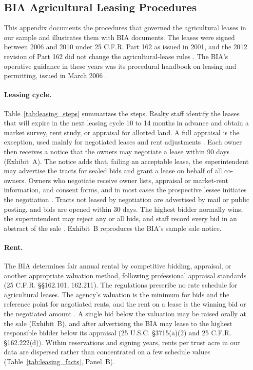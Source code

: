 \documentclass[12pt]{article}
\begin{document}
\subsection*{BIA Agricultural Leasing Procedures}

This appendix documents the procedures that governed the agricultural leases in our sample and illustrates them with BIA documents. The leases were signed between 2006 and 2010 under 25 C.F.R. Part 162 as issued in 2001, and the 2012 revision of Part 162 did not change the agricultural-lease rules \citep{DOI2001LeasingRule, BIA2012}. The BIA's operative guidance in these years was its procedural handbook on leasing and permitting, issued in March 2006 \citep{BIA2006Ch1, BIA2006Ch2}.

\paragraph{Leasing cycle.} Table~\ref{tab:leasing_steps} summarizes the steps. Realty staff identify the leases that will expire in the next leasing cycle 10 to 14 months in advance and obtain a market survey, rent study, or appraisal for allotted land. A full appraisal is the exception, used mainly for negotiated leases and rent adjustments \citep[pp.~6--7]{BIA2006Ch2}. Each owner then receives a notice that the owners may negotiate a lease within 90 days (Exhibit~A). The notice adds that, failing an acceptable lease, the superintendent may advertise the tracts for sealed bids and grant a lease on behalf of all co-owners. Owners who negotiate receive owner lists, appraisal or market-rent information, and consent forms, and in most cases the prospective lessee initiates the negotiation \citep[pp.~8--9]{BIA2006Ch2}. Tracts not leased by negotiation are advertised by mail or public posting, and bids are opened within 30 days. The highest bidder normally wins, the superintendent may reject any or all bids, and staff record every bid in an abstract of the sale \citep[pp.~15--17]{BIA2006Ch2}. Exhibit~B reproduces the BIA's sample sale notice.

\paragraph{Rent.} The BIA determines fair annual rental by competitive bidding, appraisal, or another appropriate valuation method, following professional appraisal standards (25 C.F.R. \S\S 162.101, 162.211). The regulations prescribe no rate schedule for agricultural leases. The agency's valuation is the minimum for bids and the reference point for negotiated rents, and the rent on a lease is the winning bid or the negotiated amount \citep[pp.~15--17]{BIA2006Ch2}. A single bid below the valuation may be raised orally at the sale (Exhibit~B), and after advertising the BIA may lease to the highest responsible bidder below its appraisal (25 U.S.C. \S 3715(a)(2) and 25 C.F.R. \S 162.222(d)). Within reservations and signing years, rents per trust acre in our data are dispersed rather than concentrated on a few schedule values (Table~\ref{tab:leasing_facts}, Panel~B).
\end{document}
